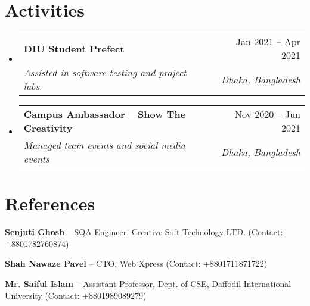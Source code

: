 \documentclass[letterpaper,11pt]{article}
\makeatletter
\newcommand{\resumeSubheading}[4]{
  \vspace{-1pt}\item
    \begin{tabular*}{0.97\textwidth}[t]{l@{\extracolsep{\fill}}r}
      \textbf{#1} & #2 \\
      \textit{\small#3} & \textit{\small #4} \\
    \end{tabular*}\vspace{-3pt}
}
\newcommand{\resumeSubHeadingListStart}{\begin{itemize}[leftmargin=0.15in, itemsep=2pt, parsep=1pt, topsep=2pt, label={}]}
\newcommand{\resumeSubHeadingListEnd}{\end{itemize}}
\makeatother
\begin{document}
\section{Activities}
\resumeSubHeadingListStart
    \resumeSubheading
      {DIU Student Prefect}{Jan 2021 -- Apr 2021}
      {Assisted in software testing and project labs}{Dhaka, Bangladesh}
    \resumeSubheading
      {Campus Ambassador – Show The Creativity}{Nov 2020 -- Jun 2021}
      {Managed team events and social media events}{Dhaka, Bangladesh}
\resumeSubHeadingListEnd
\section{References}
\begin{itemize}[leftmargin=0.15in, itemsep=1pt, parsep=1pt, topsep=1pt, label={}]
    \small{
    \item \textbf{Senjuti Ghosh} – SQA Engineer, Creative Soft Technology LTD. (Contact: +8801782760874)
    \item \textbf{Shah Nawaze Pavel} – CTO, Web Xpress (Contact: +8801711871722)
    \item \textbf{Mr. Saiful Islam} – Assistant Professor, Dept. of CSE, Daffodil International University (Contact: +8801989089279)
    }
\end{itemize}


\end{document}
